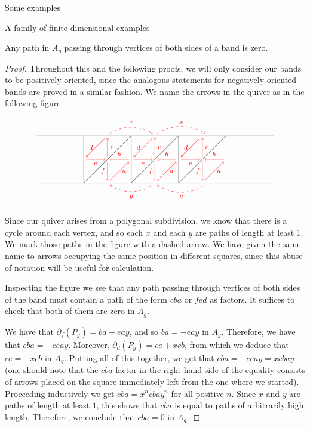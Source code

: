\begin{chapter}{Some examples}
\begin{section}{A family of finite-dimensional examples}
\begin{lemma}\label{band-sides} Any path in $A_g$ passing through vertices of both sides of a band is zero.
\end{lemma}
\begin{proof} Throughout this and the following proofs, we will only consider our bands to be positively oriented, since the analogous statements for negatively oriented bands are proved in a similar fashion. We name the arrows in the quiver as in the following figure:

\[
\begin{tikzpicture}[text width=1.5mm, font=\footnotesize]
\draw (-5, 0) -- (5, 0);
\draw (-5, 2) -- (5, 2);
\foreach \x in {-3,-1,...,3}
\draw (\x, 0) -- (\x, 2);
\foreach \x in {-3,-1,1}
{
\draw (\x,0) -- (\x+2, 2);
\draw [->, red] (\x+1.9, 1) to node[above] {$b$} (\x+1.1, 1);
\draw[->, red] (\x+1, 0.9) to node[left]{$f$} (\x+1, 0.1);
\draw[->, red] (\x+1.1, 0.1) to node[right]{$a$} (\x+1.9, 0.9);
\draw[->, red] (\x+1, 1.1) to node[right]{$c$} (\x+1, 1.9);
\draw[->, red] (\x+0.9, 1.9) to node[left]{$d$} (\x+0.1, 1.1);
\draw[->, red] (\x+0.1, 1) to node[below]{$e$} (\x+0.9, 1);
}

\draw[->, red, dashed] (-1.9, 2.1) to [bend left] node[above]{$x$} (-0.1, 2.1);
\draw[->, red, dashed] (0.1, 2.1) to [bend left] node[above]{$x$} (2.1, 2.1);
\draw[<-, red, dashed] (-1.9, -0.1) to [bend right] node[below]{$y$} (-0.1, -0.1);
\draw[<-, red, dashed] (0.1, -0.1) to [bend right] node[below]{$y$} (2.1, -0.1);
\end{tikzpicture}
\]

Since our quiver arises from a polygonal subdivision, we know that there is a cycle around each vertex, and so each $x$ and each $y$ are paths of length at least 1. We mark those paths in the figure with a dashed arrow. We have given the same name to arrows occupying the same position in different squares, since this abuse of notation will be useful for calculation.

Inspecting the figure we see that any path passing through vertices of both sides of the band must contain a path of the form $cba$ or $fed$ as factors. It suffices to check that both of them are zero in $A_g$.

We have that $\partial_f(P_g) = ba + eay$, and so $ba  = -eay$ in $A_g$. Therefore, we have that $cba = -ceay$. Moreover, $\partial_d(P_g) = ce + xcb$, from which we deduce that $ce = -xcb$ in $A_g$. Putting all of this together, we get that $cba=-ceay=xcbay$ (one should note that the $cba$ factor in the right hand side of the equality consists of arrows placed on the square immediately left from the one where we started). Proceeding inductively we get $cba=x^ncbay^n$ for all positive $n$. Since $x$ and $y$ are paths of length at least $1$, this shows that $cba$ is equal to paths of arbitrarily high length. Therefore, we conclude that $cba=0$ in $A_g$. 


\end{proof}
\end{section}
\end{chapter}

